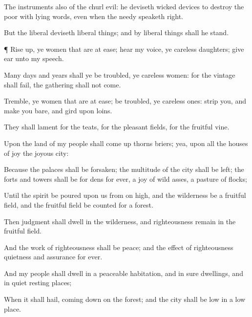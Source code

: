 {The
instruments also of the
churl
{}
evil: he
deviseth wicked
devices to
destroy the
poor with
lying
words, even when the
needy
speaketh
right.

But the
liberal
deviseth liberal
things; and by liberal
things shall he
stand.


\par }{\PP {}¶ Rise
up, ye
women that are at
ease;
hear my
voice, ye
careless
daughters; give
ear unto my
speech.

Many
days and
years shall ye be
troubled, ye careless
women: for the
vintage shall
fail, the
gathering shall not
come.

Tremble, ye women that are at
ease; be
troubled, ye careless
ones:
strip you, and make you
bare, and
gird
{} upon
{}
loins.

They shall
lament for the
teats, for the
pleasant
fields, for the
fruitful
vine.

Upon the
land of my
people shall come
up
thorns
{}
briers; yea, upon all the
houses of
joy
{} the
joyous
city:

Because the
palaces shall be
forsaken; the
multitude of the
city shall be
left; the
forts and
towers shall be for
dens
for
ever, a
joy of wild
asses, a
pasture of
flocks;

Until the
spirit be
poured upon us from on
high, and the
wilderness be a fruitful
field, and the fruitful
field be
counted for a
forest.

Then
judgment shall
dwell in the
wilderness, and
righteousness
remain in the fruitful
field.

And the
work of
righteousness shall be
peace; and the
effect of
righteousness
quietness and
assurance
for
ever.

And my
people shall
dwell in a
peaceable
habitation, and in
sure
dwellings, and in
quiet resting
places;

When it shall
hail, coming
down on the
forest; and the
city shall be
low in a low
place.

}
